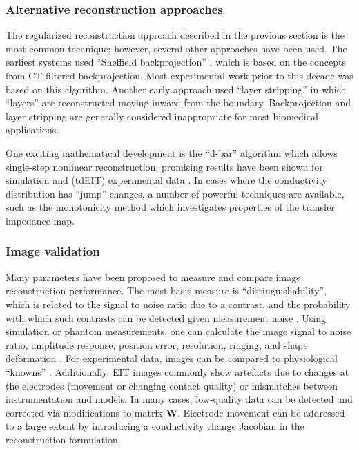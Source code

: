 \documentclass[12pt]{article} \usepackage[margin=3cm]{geometry} \usepackage[margin=20pt,font=small,labelfont=bf]{caption}\def\TBLWIDA{35mm}\def\TBLWIDB{95mm}
\newcommand{\WB}{\mathbf{W}}
\begin{document}
\subsubsection{Alternative reconstruction approaches}
The regularized reconstruction approach described in the
previous section is the most common technique; however, several
other approaches have been used. The earliest systems used
``Sheffield backprojection'' \cite{Brown1987Sheffield},
which is based on the concepts from CT filtered backprojection.
Most experimental work prior to this decade was based on this algorithm.
Another early approach used ``layer stripping'' \cite{Somersalo1991Layer}
in which ``layers'' are reconstructed moving inward from the boundary.
Backprojection and layer stripping are generally considered inappropriate for most biomedical applications.

One exciting mathematical development is the ``d-bar'' algorithm
which allows single-step nonlinear reconstruction; promising
results have been shown for simulation and (tdEIT) experimental
data  \cite{Herrera2015Direct}.
In cases where the conductivity distribution has ``jump'' changes,
a number of powerful techniques are available, such as the
monotonicity method \cite{Tamburrino2002Monotonicity} which
investigates properties of the transfer impedance map.


\subsubsection{Image validation}

Many parameters have been proposed to measure and compare
image reconstruction performance. The most basic measure
is ``distinguishability'', which is related to the signal to
noise ratio due to a contrast, and the probability with
which such contrasts can be detected given measurement
noise \cite{Isaacson1986Distinguishability, Lionheart2001Optimal}.
 Using simulation or phantom
measurements, one can calculate the
image signal to noise ratio,
amplitude response,
position error,
resolution, ringing, and shape deformation \cite{Adler2009GREIT}.
For experimental data, images can be compared to 
physiological ``knowns'' \cite{Grychtol2014Validation}.
Additionally, EIT images commonly show artefacts due
to changes at the electrodes (movement or changing contact
quality) or mismatches between instrumentation and models.
In many cases, low-quality data can be detected
and corrected \cite{Mamatjan2013Quality}
 via modifications to matrix $\WB$.
Electrode movement can be addressed to a large extent by introducing
a conductivity change Jacobian \cite{Soleimani2006Movement} in
the reconstruction formulation.
\end{document}
